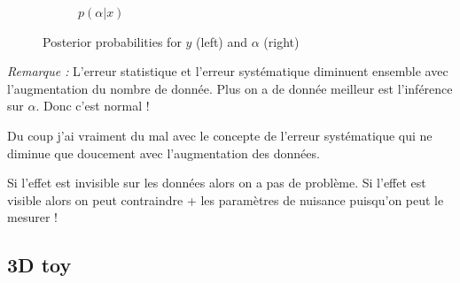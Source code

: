 \begin{figure}[htb]
\begin{subfigure}[t]{0.49\linewidth}
    \caption{$p(\alpha|x)$}
    \label{fig:marginal_alpha}
  \end{subfigure}
  \caption{Posterior probabilities for $y$ (left) and $\alpha$ (right)}
  \label{fig:marginals}
\end{figure}

\emph{Remarque :}
L'erreur statistique et l'erreur systématique diminuent ensemble avec l'augmentation du nombre de donnée.
Plus on a de donnée meilleur est l'inférence sur $\alpha$.
Donc c'est normal !

Du coup j'ai vraiment du mal avec le concepte de l'erreur systématique qui ne diminue que doucement avec l'augmentation des données.

Si l'effet est invisible sur les données alors on a pas de problème.
Si l'effet est visible alors on peut contraindre + les paramètres de nuisance puisqu'on peut le mesurer !


\subsection{3D toy} %
\label{sub:3d_toy}



